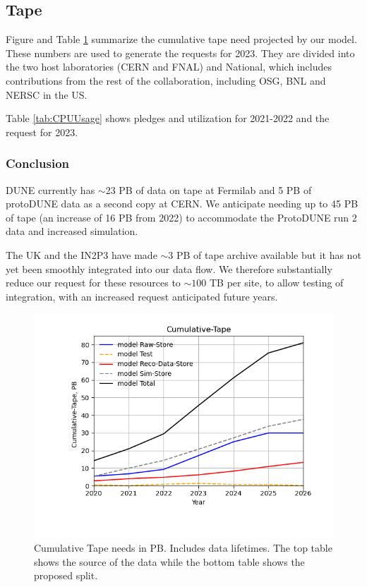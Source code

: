 \documentclass[12pt]{article}
\begin{document}
\clearpage
\subsection{Tape}



Figure and Table  \ref{fig:Cumulative-Tape}  summarize the cumulative  tape need projected by our model. These numbers are used to generate the requests for 2023.  They are divided into the two host laboratories (CERN and FNAL) and National, which includes contributions from the rest of the collaboration, including OSG, BNL and NERSC in the US. 


Table \ref{tab:CPUUsage} shows pledges and utilization for 2021-2022 and the request for 2023.  \subsubsection{Conclusion}\label{sec:taperesult}
DUNE currently has $\sim$23 PB of data on tape at Fermilab and 5 PB of protoDUNE data as a second copy at CERN.  We anticipate needing up to 45 PB of tape (an increase of 16 PB from 2022) to accommodate the ProtoDUNE run 2 data and increased simulation. 

The UK and the IN2P3 have made $\sim 3$ PB of tape archive available but it has not yet been smoothly integrated into our data flow.  We  therefore substantially reduce our request for these resources to $\sim 100$ TB per site, to allow testing of integration, with an increased request anticipated future years. 

\begin{figure}[h]
\centering\includegraphics[height=0.4\textwidth]{MoreSim_2022-11-21-2026/MoreSim_2022-11-21-2026-Cumulative-Tape.png}

\caption{Cumulative Tape needs in PB. Includes data lifetimes.  The top table shows the source of the data while the bottom table  shows the proposed split.}\label{fig:Cumulative-Tape}
\end{figure}
\end{document}
